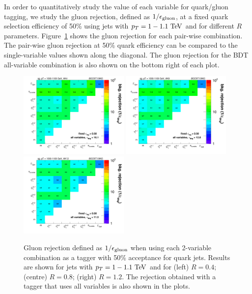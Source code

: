In order to quantitatively study the value of each variable for quark/gluon tagging, we study the gluon 
rejection, defined as $1/\epsilon_{\rm gluon}$, at a fixed quark selection efficiency
of 50\% using jets with $\pt=1-1.1 \TeV$ and for different $R$ parameters. Figure~\ref{fig:qg_pt1000_comb} shows the gluon rejection for each pair-wise combination. 
The pair-wise gluon rejection at 50\% quark efficiency can be compared to the single-variable
values shown along the diagonal. The gluon rejection for the 
BDT all-variable combination is also shown on the bottom right of each plot.
\begin{figure}
\begin{center}
\includegraphics[width=0.48\textwidth]{./Figures/QGTagging/pT1000/AKtR04/effBkg2D.png}
\includegraphics[width=0.48\textwidth]{./Figures/QGTagging/pT1000/AKtR08/effBkg2D.png}
\includegraphics[width=0.48\textwidth]{./Figures/QGTagging/pT1000/AKtR12/effBkg2D.png}
\caption{Gluon rejection defined as $1/\epsilon_{\rm gluon}$ when using each 2-variable combination 
as a tagger with 50\% acceptance for quark jets. Results are shown for
jets with $\pt=1-1.1 \TeV$ and
for (left) $R=0.4$; (centre) $R=0.8$; (right) $R=1.2$. The rejection obtained with a tagger that uses all variables is also shown
in the plots. }
\label{fig:qg_pt1000_comb}
\end{center}
\end{figure}

